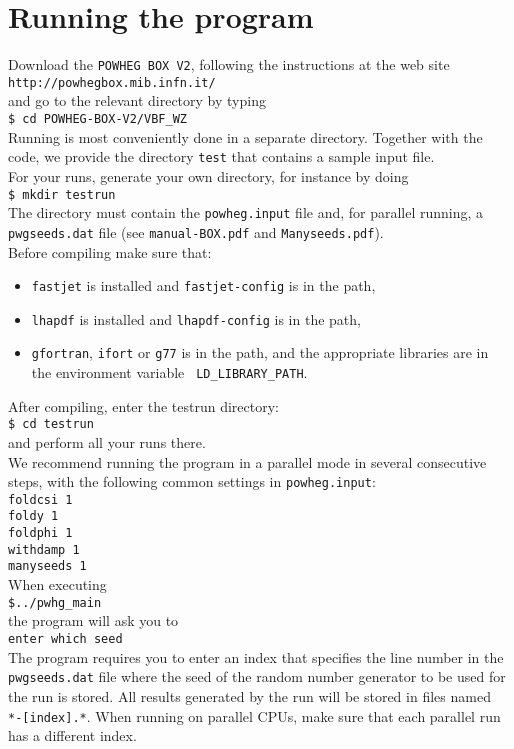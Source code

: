 \documentclass[a4paper,11pt]{article}
\begin{document}
\section*{Running the program}
%
Download the {\tt POWHEG BOX V2}, following the instructions at the web site 
\\[2ex]
{\tt http://powhegbox.mib.infn.it/}
\\[2ex] 
and go to the relevant directory by typing 
\\[2ex]
{\tt \$ cd POWHEG-BOX-V2/VBF\_WZ}  
\\[2ex]
Running is most conveniently done in a separate directory. Together with the code, we provide the directory {\tt test} that contains a sample input file. 
\\[2ex]
For your runs, generate your own directory, for instance by doing 
\\[2ex]
{\tt \$ mkdir testrun}
\\[2ex]
The directory must contain the {\tt powheg.input} file and, for
parallel running, a {\tt pwgseeds.dat} file (see {\tt manual-BOX.pdf}
and {\tt Manyseeds.pdf}).
\\[2ex]
Before compiling make sure that:
\begin{itemize}
\item 
{\tt fastjet} is installed and {\tt fastjet-config} is in the path,
\item 
{\tt lhapdf} is installed and {\tt lhapdf-config} is in the path,
\item
{\tt gfortran}, {\tt ifort} or {\tt g77} is in the path, and the
appropriate libraries are in the environment variable {\tt
  LD\_LIBRARY\_PATH}. 
\end{itemize}
%
After compiling, enter the testrun directory:
\\[2ex]
{\tt \$ cd testrun}
\\[2ex]
and perform all your runs there. 
\\[2ex]
We recommend running the program in a parallel mode in several consecutive steps, with the following common settings in {\tt powheg.input}:
\\[2ex]
{\tt foldcsi   1}
\\
{\tt foldy     1}
\\
{\tt foldphi   1}
\\
{\tt withdamp   1}
\\
{\tt manyseeds   1}
\\[2ex]
When executing
\\[2ex]
{\tt \$../pwhg\_main}
\\[2ex]
the program will ask you to
\\[2ex]
{\tt enter which seed}
\\[2ex]
The program requires you to enter an index that specifies the line
number in the {\tt pwgseeds.dat} file where the seed of the random
number generator to be used for the run is stored. All results
generated by the run will be stored in files named {\tt
  *-[index].*}. When running on parallel CPUs, make sure that each
parallel run has a different index.
% 
\end{document}
